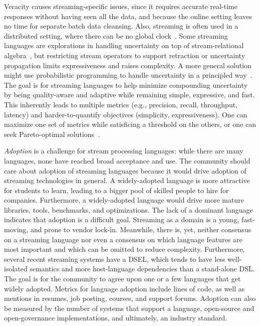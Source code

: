 Veracity causes streaming-specific issues, since it requires accurate
real-time responses without having seen all the data, and because the
online setting leaves no time for separate batch data cleansing. Also,
streaming is often used in a distributed setting, where there can be
no global clock~\cite{lamport_1978}. Some streaming languages are
explorations in handling uncertainty on top of stream-relational
algebra~\cite{tran_et_al_2010}, but restricting stream
operators to support retraction or uncertainty propagation limits
expressiveness and raises complexity. A more general solution might use
probabilistic programming to handle uncertainty in a principled
way~\cite{gordon_et_al_2014}. The goal is for streaming languages to help minimize compounding
uncertainty by being quality-aware and adaptive while remaining
simple, expressive, and fast. This inherently leads to multiple
metrics (e.g., precision, recall, throughput, latency) and
harder-to-quantify objectives (simplicity, expressiveness). One can
maximize one set of metrics while satisficing a threshold on the
others, or one can seek Pareto-optimal
solutions~\cite{zhang_hirzel_grove_2016}.

\emph{Adoption} is a challenge for stream processing languages: while
there are many languages, none have reached broad acceptance and use.
The community should care about adoption of streaming languages
because it would drive adoption of streaming technologies in general.
A widely-adopted language is more attractive for students to learn,
leading to a bigger pool of skilled people to hire for companies.
Furthermore, a widely-adopted language would drive more
mature libraries, tools, benchmarks, and optimizations. The lack of a
dominant language indicates that adoption is a difficult goal. Streaming as a domain is a young, fast-moving, and prone to vendor
lock-in. Meanwhile, there is, yet, neither consensus on a
streaming language nor even a consensus on which language
features are most important and which can be omitted to reduce
complexity. Furthermore, several recent streaming systems have a DSEL,
which tends to have less well-isolated semantics and more
host-language dependencies than a stand-alone DSL. The goal is for the community to agree upon one or a few languages that get
widely adopted. Metrics for language adoption include lines of code,
as well as mentions in resumes, job posting, courses, and support
forums. Adoption can also be measured by the number of systems that
support a language, open-source and open-governance implementations,
and ultimately, an industry standard.
\iffalse
We hope this summary of our working group discussion helps guide
future streaming-language research in novel and impactful directions.
\fi